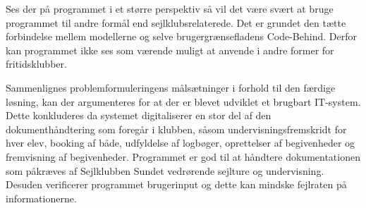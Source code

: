 Ses der på programmet i et større perspektiv så vil det være svært at bruge programmet til andre formål end sejlklubsrelaterede. 
Det er grundet den tætte forbindelse mellem modellerne og selve brugergrænsefladens Code-Behind. 
Derfor kan programmet ikke ses som værende muligt at anvende i andre former for fritidsklubber.

Sammenlignes problemformuleringens målsætninger i forhold til den færdige løsning, kan der argumenteres for at der er blevet udviklet et brugbart IT-system. 
Dette konkluderes da systemet digitaliserer en stor del af den dokumenthåndtering som foregår i klubben, såsom undervisningsfremskridt for hver elev, booking af både, udfyldelse af logbøger, oprettelser af begivenheder og fremvisning af begivenheder.
Programmet er god til at håndtere dokumentationen som påkræves af Sejlklubben Sundet vedrørende sejlture og undervisning.
Desuden verificerer programmet brugerinput og dette kan mindske fejlraten på informationerne.